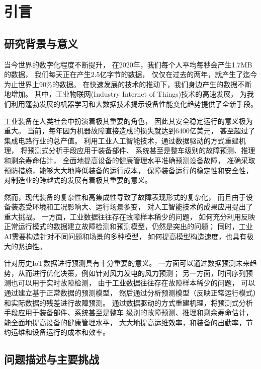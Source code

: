 
\chapter{引言}\label{chapter1}

\section{研究背景与意义}
当今世界的数字化程度不断提升，
在2020年，我们每个人平均每秒会产生1.7MB的数据，
我们每天正在产生2.5亿字节的数据，
仅仅在过去的两年，就产生了迄今为止世界上90\%的数据\cite{siegel2013predictive}。
在快速发展的技术的推动下，我们身边产生的数据不断地增加。
其中，工业物联网(Industry Internet of Things)技术的高速发展，
为我们利用蓬勃发展的机器学习和大数据技术揭示设备性能变化趋势提供了全新手段。

工业装备在人类社会中扮演着极其重要的角色，
因此其安全稳定运行的意义极为重大。
当前，每年因为机器故障直接造成的损失就达到6400亿美元\cite{isa}，
甚至超过了集成电路行业的总产值。
利用工业人工智能技术，通过数据驱动的方式重建机理，
将预测式分析手段应用于装备部件、
系统甚至是整车级别的故障预测、推理和剩余寿命估计，
全面地提高设备的健康管理水平准确预测设备故障，
准确采取预防措施，能够大大地降低装备的运行成本，
保障装备运行的稳定性和安全性，
对制造业的跨越式的发展有着极其重要的意义。


然而，现代装备的复杂性和高集成性导致了故障表现形式的复杂化，
而且由于设备装态受环境和工况影响大、运行场景多变，
对人工智能技术的成果应用提出了重大挑战。
一方面，工业数据往往存在故障样本稀少的问题，
如何充分利用反映正常运行模式的数据建立故障检测和预测模型，仍然是突出的问题；
同时，工业AI需要构造针对不同问题和场景的多种模型，
如何提高模型构造速度，也具有极大的紧迫性。


针对历史IoT数据进行预测具有十分重要的意义。
一方面可以通过数据预测未来趋势，从而进行优化决策，例如针对风力发电的风力预测；
另一方面，时间序列预测也可以用于实时故障检测，
由于工业数据往往存在故障样本稀少的问题，
可以通过建立基于正常数据的预测模型，
然后通过分析预测模型（反映正常运行模式）和实际数据的残差进行故障预测。
通过数据驱动的方式重建机理，将预测式分析手段应用于装备部件、系统甚至是整车
级别的故障预测、推理和剩余寿命估计，能全面地提高设备的健康管理水平，
大大地提高运维效率，和装备的出勤率，节约运维和设备运行的成本和效率。

\section{问题描述与主要挑战}
